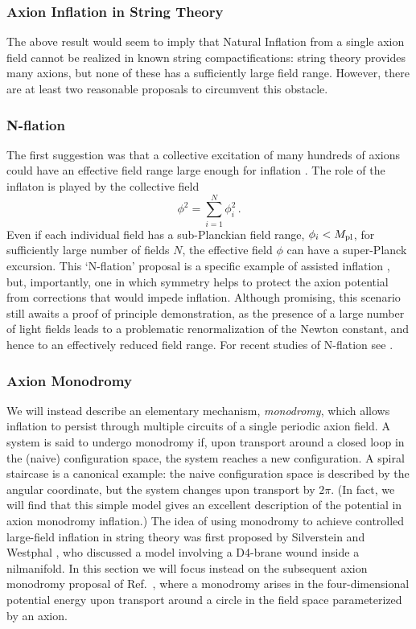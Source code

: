 \documentclass[12pt,letterpaper,rotate]{article}
\def\beq{\begin{equation}}
\def\eeq{\end{equation}}
\begin{document}
{\subsubsection{Axion Inflation in String Theory}
\label{sec:axioninflation}

The above result would seem to imply that Natural Inflation from a single axion field cannot be realized in known string compactifications: string theory provides many axions, but none of these has a sufficiently large field range.  However, there are at least two reasonable proposals to circumvent this obstacle.

\subsubsection*{N-flation}

The first suggestion was that a collective excitation of many hundreds of axions could have an effective field range large enough for inflation
\cite{Nflation, Easther:2005zr}. 
The role of the inflaton is played by the collective field
\beq
\phi^2 = \sum_{i=1}^N \phi_i^2\, .
\eeq
Even if each individual field has a sub-Planckian field range, $\phi_i < M_{\rm pl}$, for sufficiently large number of fields $N$, the effective field $\phi$ can have a super-Planck excursion.
This `N-flation' proposal is a specific example of assisted inflation \cite{Liddle:1998jc}, but, importantly, one in which symmetry helps to protect the axion potential from corrections that would impede inflation. Although promising, this scenario still awaits a proof of principle demonstration, as the presence of a large number of light fields leads to a problematic renormalization of the Newton constant, and hence to an effectively reduced field range.
For recent studies of N-flation see \cite{Kallosh:2007cc, Grimm:2007hs}.


\subsubsection*{Axion Monodromy}

We will instead describe  an elementary mechanism, {\it{monodromy}}, which allows inflation to persist through multiple circuits of a single periodic axion field.  A system is said to undergo monodromy if, upon transport around a closed loop in the (naive) configuration space, the system reaches a new configuration.  A spiral staircase is a canonical example: the naive configuration space is described by the angular coordinate, but the system changes upon transport by $2\pi$. (In fact, we will find that this simple model gives an excellent description of the potential in axion monodromy inflation.)
The idea of using monodromy to achieve controlled large-field inflation in string theory was first proposed by Silverstein and Westphal \cite{Silverstein:2008sg}, who discussed a model involving a D4-brane wound inside a nilmanifold.  In this section we will focus instead on the subsequent axion monodromy proposal of Ref.~\cite{MSW}, where a monodromy arises in the four-dimensional potential energy
upon transport around a circle in the field space parameterized by an axion.

}
\end{document}
